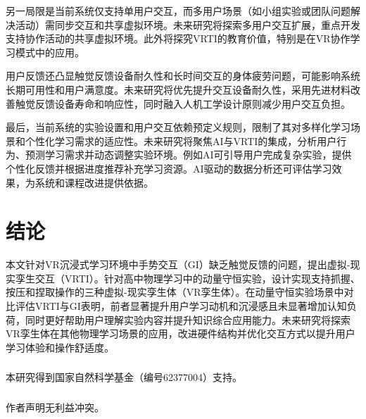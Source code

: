 \documentclass[runningheads]{llncs}
\begin{document}
另一局限是当前系统仅支持单用户交互，而多用户场景（如小组实验或团队问题解决活动）需同步交互和共享虚拟环境。未来研究将探索多用户交互扩展，重点开发支持协作活动的共享虚拟环境。此外将探究VRTI的教育价值，特别是在VR协作学习模式中的应用。

用户反馈还凸显触觉反馈设备耐久性和长时间交互的身体疲劳问题，可能影响系统长期可用性和用户满意度。未来研究将优先提升交互设备耐久性，采用先进材料改善触觉反馈设备寿命和响应性，同时融入人机工学设计原则减少用户交互负担。

最后，当前系统的实验设置和用户交互依赖预定义规则，限制了其对多样化学习场景和个性化学习需求的适应性。未来研究将聚焦AI与VRTI的集成，分析用户行为、预测学习需求并动态调整实验环境。例如AI可引导用户完成复杂实验，提供个性化反馈并根据进度推荐补充学习资源。AI驱动的数据分析还可评估学习效果，为系统和课程改进提供依据。

\section{结论}
本文针对VR沉浸式学习环境中手势交互（GI）缺乏触觉反馈的问题，提出虚拟-现实孪生交互（VRTI）。针对高中物理学习中的动量守恒实验，设计实现支持抓握、按压和捏取操作的三种虚拟-现实孪生体（VR孪生体）。在动量守恒实验场景中对比评估VRTI与GI表明，前者显著提升用户学习动机和沉浸感且未显著增加认知负荷，同时更好帮助用户理解实验内容并提升知识综合应用能力。未来研究将探索VR孪生体在其他物理学习场景的应用，改进硬件结构并优化交互方式以提升用户学习体验和操作舒适度。

\begin{credits}
\subsubsection{\ackname} 
本研究得到国家自然科学基金（编号62377004）支持。

\subsubsection{\discintname}
作者声明无利益冲突。
\end{credits}



\end{document}
